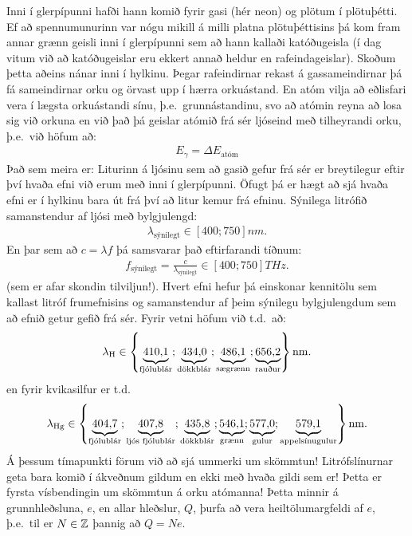 Inni í glerpípunni hafði hann komið fyrir gasi (hér neon) og plötum í plötuþétti. Ef að spennumunurinn var nógu mikill á milli platna plötuþéttisins þá kom fram annar grænn geisli inni í glerpípunni sem að hann kallaði katóðugeisla (í dag vitum við að katóðugeislar eru ekkert annað heldur en rafeindageislar). Skoðum þetta aðeins nánar inni í hylkinu. Þegar rafeindirnar rekast á gassameindirnar þá fá sameindirnar orku og örvast upp í hærra orkuástand. En atóm vilja að eðlisfari vera í lægsta orkuástandi sínu, þ.e.~grunnástandinu, svo að atómin reyna að losa sig við orkuna en við það þá geislar atómið frá sér ljóseind með tilheyrandi orku, þ.e.~við höfum að:
\begin{align*}
    E_{\gamma} = \Delta E_{\text{atóm}}
\end{align*}
Það sem meira er: Liturinn á ljósinu sem að gasið gefur frá sér er breytilegur eftir því hvaða efni við erum með inni í glerpípunni. Öfugt þá er hægt að sjá hvaða efni er í hylkinu bara út frá því að litur kemur frá efninu. Sýnilega litrófið samanstendur af ljósi með bylgjulengd:
\begin{align*}
    \lambda_{\text{sýnilegt}} \in \left[ 400;750 \right] \si{nm}.
\end{align*}
En þar sem að $c = \lambda f$ þá samsvarar það eftirfarandi tíðnum:
\begin{align*}
    f_{\text{sýnilegt}} = \frac{c}{\lambda_{\text{sýnilegt}}}  \in \left[ 400; 750 \right] \si{THz}.
\end{align*}
(sem er afar skondin tilviljun!). Hvert efni hefur þá einskonar kennitölu sem kallast litróf frumefnisins og samanstendur af þeim sýnilegu bylgjulengdum sem að efnið getur gefið frá sér. Fyrir vetni höfum við t.d.~að:
\begin{align*}
    \lambda_{\text{H}} \in \left\{ \explain{\SI{410,1}{}}{\text{fjólublár}}; \explain{\SI{434,0}{}}{\text{dökkblár}}; \explain{\SI{486,1}{}}{\text{sægrænn}}; \explain{\SI{656,2}{}}{\text{rauður}} \right\} \si{nm}.
\end{align*}
en fyrir kvikasilfur er t.d.~
\begin{align*}
    \lambda_{\text{Hg}} \in \left\{ \explain{\SI{404,7}{}}{\text{fjólublár}}; \explain{\SI{407,8}{}}{\text{ljós fjólublár}}; \explain{\SI{435,8}{}}{\text{dökkblár}}; \explain{\SI{546,1}{}}{\text{grænn}}; \explain{\SI{577,0}{}}{\text{gulur}}; \explain{\SI{579.1}{}}{\text{appelsínugulur}}\right\} \si{nm}.
\end{align*}
Á þessum tímapunkti förum við að sjá ummerki um skömmtun! Litrófslínurnar geta bara komið í ákveðnum gildum en ekki með hvaða gildi sem er! Þetta er fyrsta vísbendingin um skömmtun á orku atómanna! Þetta minnir á grunnhleðsluna, $e$, en allar hleðslur, $Q$, þurfa að vera heiltölumargfeldi af $e$, þ.e.~til er $N \in \Z$ þannig að $Q = Ne$.


